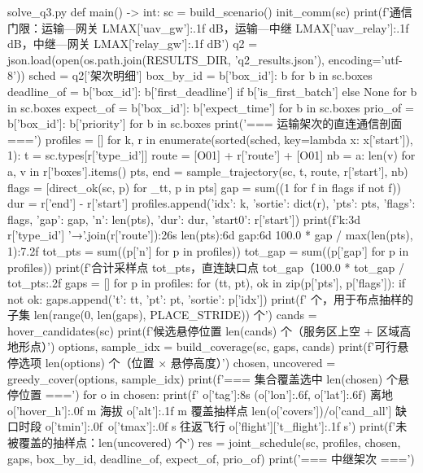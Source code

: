 \documentclass[bwprint]{gmcmthesis}
\begin{document}
\begin{appendices}
\begin{Python}{solve\_q3.py}
def main() -> int:
    sc = build_scenario()
    init_comm(sc)
    print(f'通信门限：运输—网关 {LMAX['uav_gw']:.1f} dB，运输—中继 {LMAX['uav_relay']:.1f} dB，中继—网关 {LMAX['relay_gw']:.1f} dB')
    q2 = json.load(open(os.path.join(RESULTS_DIR, 'q2_results.json'), encoding='utf-8'))
    sched = q2['架次明细']
    box_by_id = {b['box_id']: b for b in sc.boxes}
    deadline_of = {b['box_id']: b['first_deadline'] if b['is_first_batch'] else None for b in sc.boxes}
    expect_of = {b['box_id']: b['expect_time'] for b in sc.boxes}
    prio_of = {b['box_id']: b['priority'] for b in sc.boxes}
    print('\n=== 运输架次的直连通信剖面 ===')
    profiles = []
    for k, r in enumerate(sorted(sched, key=lambda x: x['start']), 1):
        t = sc.types[r['type_id']]
        route = [O01] + r['route'] + [O01]
        nb = {a: len(v) for a, v in r['boxes'].items()}
        pts, end = sample_trajectory(sc, t, route, r['start'], nb)
        flags = [direct_ok(sc, p) for _tt, p in pts]
        gap = sum((1 for f in flags if not f))
        dur = r['end'] - r['start']
        profiles.append({'idx': k, 'sortie': dict(r), 'pts': pts, 'flags': flags, 'gap': gap, 'n': len(pts), 'dur': dur, 'start0': r['start']})
        print(f'{k:3d}  {r['type_id']}   {'→'.join(r['route']):26s} {len(pts):6d} {gap:6d} {100.0 * gap / max(len(pts), 1):7.2f}%
    tot_pts = sum((p['n'] for p in profiles))
    tot_gap = sum((p['gap'] for p in profiles))
    print(f'合计采样点 {tot_pts}，直连缺口点 {tot_gap}（{100.0 * tot_gap / tot_pts:.2f}%
    gaps = []
    for p in profiles:
        for (tt, pt), ok in zip(p['pts'], p['flags']):
            if not ok:
                gaps.append({'t': tt, 'pt': pt, 'sortie': p['idx']})
    print(f' 个，用于布点抽样的子集 {len(range(0, len(gaps), PLACE_STRIDE))} 个')
    cands = hover_candidates(sc)
    print(f'候选悬停位置 {len(cands)} 个（服务区上空 + 区域高地形点）')
    options, sample_idx = build_coverage(sc, gaps, cands)
    print(f'可行悬停选项 {len(options)} 个（位置 × 悬停高度）')
    chosen, uncovered = greedy_cover(options, sample_idx)
    print(f'\n=== 集合覆盖选中 {len(chosen)} 个悬停位置 ===')
    for o in chosen:
        print(f'  {o['tag']:8s} ({o['lon']:.6f}, {o['lat']:.6f}) 离地 {o['hover_h']:.0f} m 海拔 {o['alt']:.1f} m 覆盖抽样点 {len(o['covers'])}/{o['cand_all']} 缺口时段 {o['tmin']:.0f}~{o['tmax']:.0f} s 往返飞行 {o['flight']['t_flight']:.1f} s')
    print(f'未被覆盖的抽样点：{len(uncovered)} 个')
    res = joint_schedule(sc, profiles, chosen, gaps, box_by_id, deadline_of, expect_of, prio_of)
    print('\n=== 中继架次 ===')

\end{Python}
\end{appendices}
\end{document}
